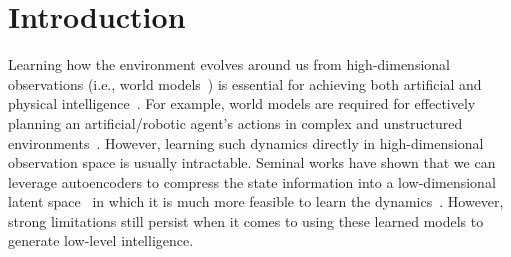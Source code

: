 \section{Introduction}
Learning how the environment evolves around us from high-dimensional observations (i.e., world models~\cite{ha2018world}) is essential for achieving both artificial and physical intelligence~\cite{hafner2023mastering}.
For example, world models are required for effectively planning an artificial/robotic agent's actions in complex and unstructured environments~\cite{matsuo2022deep}. 
However, learning such dynamics directly in high-dimensional observation space is usually intractable. Seminal works have shown that we can leverage autoencoders to compress the state information into a low-dimensional latent space~\cite{liou2014autoencoder, kingma2014auto} in which it is much more feasible to learn the dynamics~\cite{watter2015embed, lenz2015deepmpc, wahlstrom2015learning, champion2019data, zhong2020unsupervised}.
%
However, strong limitations still persist when it comes to using these learned models to generate low-level intelligence.

